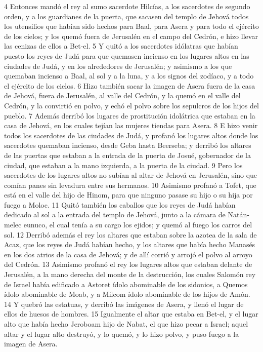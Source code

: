  
4 Entonces mandó el rey al sumo sacerdote Hilcías, a los sacerdotes de segundo orden, y a los guardianes de la puerta, que sacasen del templo de Jehová todos los utensilios que habían sido hechos para Baal, para Asera y para todo el ejército de los cielos; y los quemó fuera de Jerusalén en el campo del Cedrón, e hizo llevar las cenizas de ellos a Bet-el.
5 Y quitó a los sacerdotes idólatras que habían puesto los reyes de Judá para que quemasen incienso en los lugares altos en las ciudades de Judá, y en los alrededores de Jerusalén; y asimismo a los que quemaban incienso a Baal, al sol y a la luna, y a los signos del zodíaco, y a todo el ejército de los cielos. 
6 Hizo también sacar la imagen de Asera fuera de la casa de Jehová, fuera de Jerusalén, al valle del Cedrón, y la quemó en el valle del Cedrón, y la convirtió en polvo, y echó el polvo sobre los sepulcros de los hijos del pueblo. 
7 Además derribó los lugares de prostitución idolátrica que estaban en la casa de Jehová, en los cuales tejían las mujeres tiendas para Asera.
8 E hizo venir todos los sacerdotes de las ciudades de Judá, y profanó los lugares altos donde los sacerdotes quemaban incienso, desde Geba hasta Beerseba; y derribó los altares de las puertas que estaban a la entrada de la puerta de Josué, gobernador de la ciudad, que estaban a la mano izquierda, a la puerta de la ciudad.
9 Pero los sacerdotes de los lugares altos no subían al altar de Jehová en Jerusalén, sino que comían panes sin levadura entre sus hermanos.
10 Asimismo profanó a Tofet, que está en el valle del hijo de Hinom, para que ninguno pasase su hijo o su hija por fuego a Moloc. 
11 Quitó también los caballos que los reyes de Judá habían dedicado al sol a la entrada del templo de Jehová, junto a la cámara de Natán-melec eunuco, el cual tenía a su cargo los ejidos; y quemó al fuego los carros del sol.
12 Derribó además el rey los altares que estaban sobre la azotea de la sala de Acaz, que los reyes de Judá habían hecho, y los altares que había hecho Manasés en los dos atrios de la casa de Jehová; y de allí corrió y arrojó el polvo al arroyo del Cedrón.
13 Asimismo profanó el rey los lugares altos que estaban delante de Jerusalén, a la mano derecha del monte de la destrucción, los cuales Salomón rey de Israel había edificado a Astoret ídolo abominable de los sidonios, a Quemos ídolo abominable de Moab, y a Milcom ídolo abominable de los hijos de Amón. 
14 Y quebró las estatuas, y derribó las imágenes de Asera, y llenó el lugar de ellos de huesos de hombres.
15 Igualmente el altar que estaba en Bet-el, y el lugar alto que había hecho Jeroboam hijo de Nabat, el que hizo pecar a Israel; aquel altar y el lugar alto destruyó, y lo quemó, y lo hizo polvo, y puso fuego a la imagen de Asera.
